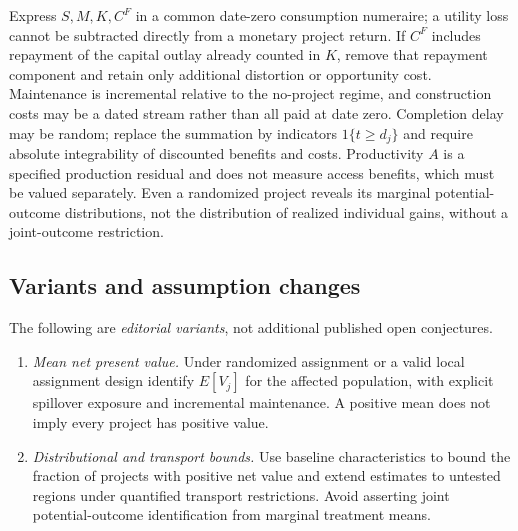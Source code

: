 \documentclass[11pt,a4paper]{article}
\begin{document}
Express \(S,M,K,C^F\) in a common date-zero consumption numeraire; a utility loss cannot be subtracted directly from a monetary project return. If \(C^F\) includes repayment of the capital outlay already counted in \(K\), remove that repayment component and retain only additional distortion or opportunity cost. Maintenance is incremental relative to the no-project regime, and construction costs may be a dated stream rather than all paid at date zero. Completion delay may be random; replace the summation by indicators \(1\{t\ge d_j\}\) and require absolute integrability of discounted benefits and costs. Productivity \(A\) is a specified production residual and does not measure access benefits, which must be valued separately. Even a randomized project reveals its marginal potential-outcome distributions, not the distribution of realized individual gains, without a joint-outcome restriction.
\subsection*{Variants and assumption changes}
The following are \emph{editorial variants}, not additional published open conjectures.
\begin{enumerate}
\item \emph{Mean net present value.} Under randomized assignment or a valid local assignment design identify \(E[V_j]\) for the affected population, with explicit spillover exposure and incremental maintenance. A positive mean does not imply every project has positive value.
\item \emph{Distributional and transport bounds.} Use baseline characteristics to bound the fraction of projects with positive net value and extend estimates to untested regions under quantified transport restrictions. Avoid asserting joint potential-outcome identification from marginal treatment means.
\end{enumerate}
\end{document}
